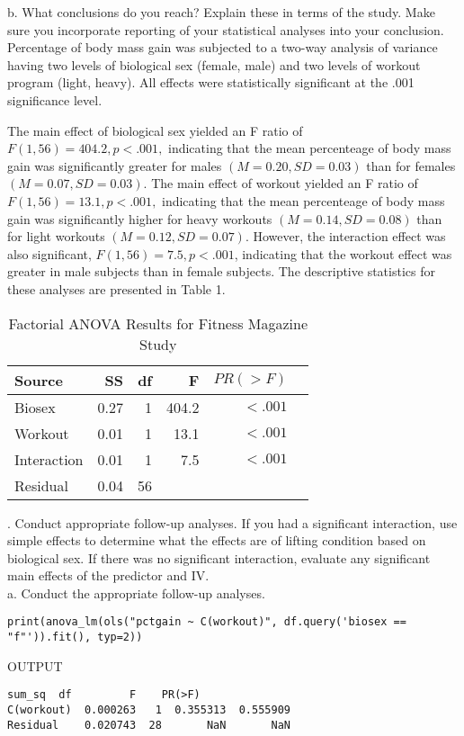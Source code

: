 \documentclass[onecolumn,10pt]{jhwhw}
\begin{document}
\noindent b. What conclusions do you reach? Explain these in terms of the study. Make sure you incorporate reporting of your statistical analyses into your conclusion.\\

Percentage of body mass gain was subjected to a two-way analysis of variance having two levels of biological sex (female, male) and two levels of workout program (light, heavy). All effects were statistically significant
at the .001 significance level.

The main effect of biological sex yielded an F ratio of $F(1, 56) = 404.2, p < .001,$ indicating that the mean percenteage of body mass gain was significantly greater for males $(M = 0.20, SD = 0.03)$ than for females $(M = 0.07, SD = 0.03)$. The main effect of workout yielded an F ratio of $F(1, 56) = 13.1, p < .001,$ indicating that the mean percenteage of body mass gain was significantly higher for heavy workouts $(M = 0.14, SD = 0.08)$ than for light workouts $(M = 0.12, SD = 0.07)$. However, the interaction effect was also significant, $F(1, 56) = 7.5, p < .001$, indicating that the workout effect was greater in male subjects than in female subjects. The descriptive statistics for these analyses are presented in Table 1.

\begin{table}[htdp]
\begin{center}
\begin{tabular}{l r r r r r}
\toprule
Source & SS & df & F & $PR(>F)$ \\
\midrule
Biosex       & 0.27 &  1  & 404.2 & $<.001$ \\
Workout      & 0.01 &  1  & 13.1  & $<.001$\\
Interaction  & 0.01 &  1  & 7.5   & $<.001$\\
Residual     & 0.04 & 56  & & \\
\bottomrule
\end{tabular}
\end{center}
\caption{Factorial ANOVA Results for Fitness Magazine Study}
\end{table}

. Conduct appropriate follow-up analyses. If you had a significant interaction, use simple effects to determine what the effects are of lifting condition based on biological sex. If there was no significant interaction, evaluate any significant main effects of the predictor and IV.
\\
\noindent a. Conduct the appropriate follow-up analyses.
\begin{lstlisting}
print(anova_lm(ols("pctgain ~ C(workout)", df.query('biosex == "f"')).fit(), typ=2))
\end{lstlisting}
\noindent OUTPUT
\begin{lstlisting}[language={}]
              sum_sq  df         F    PR(>F)
C(workout)  0.000263   1  0.355313  0.555909
Residual    0.020743  28       NaN       NaN
\end{lstlisting}
\end{document}
